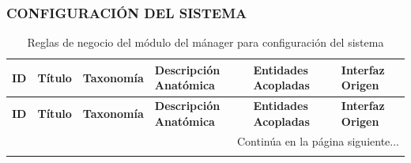 \begin{landscape}
\subsubsection{CONFIGURACIÓN DEL SISTEMA}
\begingroup
\setlength{\LTleft}{\fill}
\setlength{\LTright}{\fill}

\begin{longtable}[c]{l p{2.1cm} p{2.1cm} p{8cm} p{4cm} p{3cm}}
\caption{Reglas de negocio del módulo del mánager para configuración del sistema} \label{tab:reglas-negocio-manager-configuracion-sistema}\\
\toprule
\textbf{ID} & \textbf{Título} & \textbf{Taxonomía} & \textbf{Descripción Anatómica} & \textbf{Entidades Acopladas} & \textbf{Interfaz Origen} \\
\midrule
\endfirsthead

\toprule
\textbf{ID} & \textbf{Título} & \textbf{Taxonomía} & \textbf{Descripción Anatómica} & \textbf{Entidades Acopladas} & \textbf{Interfaz Origen} \\
\midrule
\endhead

\midrule
\multicolumn{6}{r}{\small Continúa en la página siguiente...} \\
\endfoot
\bottomrule
\endlastfoot


\end{longtable}
\end{landscape}
